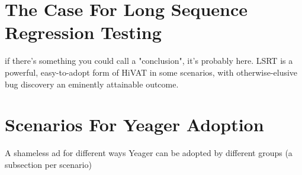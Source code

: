 \section{The Case For Long Sequence Regression Testing}
  if there's something you could call a "conclusion", it's probably here. LSRT is a powerful, easy-to-adopt form of HiVAT in some scenarios, with otherwise-elusive bug discovery an eminently attainable outcome. %

\section{Scenarios For Yeager Adoption}
A shameless ad for different ways Yeager can be adopted by different groups (a subsection per scenario) %
